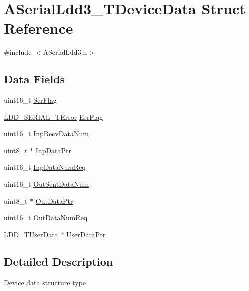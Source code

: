 \hypertarget{struct_a_serial_ldd3___t_device_data}{}\section{A\+Serial\+Ldd3\+\_\+\+T\+Device\+Data Struct Reference}
\label{struct_a_serial_ldd3___t_device_data}


{\ttfamily \#include $<$A\+Serial\+Ldd3.\+h$>$}

\subsection*{Data Fields}
\begin{DoxyCompactItemize}
\item 
uint16\+\_\+t \hyperlink{struct_a_serial_ldd3___t_device_data_ac5976cce408fe2fc499c24f47af3a7bf}{Ser\+Flag}
\item 
\hyperlink{group___p_e___types__module_ga3bd5d57e02458ce220540d0ad0462e06}{L\+D\+D\+\_\+\+S\+E\+R\+I\+A\+L\+\_\+\+T\+Error} \hyperlink{struct_a_serial_ldd3___t_device_data_a05b64d6f513362f88966c3f2c78b7b3a}{Err\+Flag}
\item 
uint16\+\_\+t \hyperlink{struct_a_serial_ldd3___t_device_data_ad76ae8501e5a6c9256bfc1fc3a963a49}{Inp\+Recv\+Data\+Num}
\item 
uint8\+\_\+t $\ast$ \hyperlink{struct_a_serial_ldd3___t_device_data_aec44055714cf40d0afd9a06810807a5d}{Inp\+Data\+Ptr}
\item 
uint16\+\_\+t \hyperlink{struct_a_serial_ldd3___t_device_data_a3cb890aa80cf95c580574ffde2e56267}{Inp\+Data\+Num\+Req}
\item 
uint16\+\_\+t \hyperlink{struct_a_serial_ldd3___t_device_data_a87d0ed131c5f8f238e5c11c3b0f3c498}{Out\+Sent\+Data\+Num}
\item 
uint8\+\_\+t $\ast$ \hyperlink{struct_a_serial_ldd3___t_device_data_a1046c225ffdc7216030943b61d4e7863}{Out\+Data\+Ptr}
\item 
uint16\+\_\+t \hyperlink{struct_a_serial_ldd3___t_device_data_a5a0cb23a096e8d85a9454a5e3168c833}{Out\+Data\+Num\+Req}
\item 
\hyperlink{group___p_e___types__module_ga0b66a73f87238a782318aa0be7578e35}{L\+D\+D\+\_\+\+T\+User\+Data} $\ast$ \hyperlink{struct_a_serial_ldd3___t_device_data_a9b759cfd3585dc45464d70f56388d773}{User\+Data\+Ptr}
\end{DoxyCompactItemize}


\subsection{Detailed Description}
Device data structure type 

